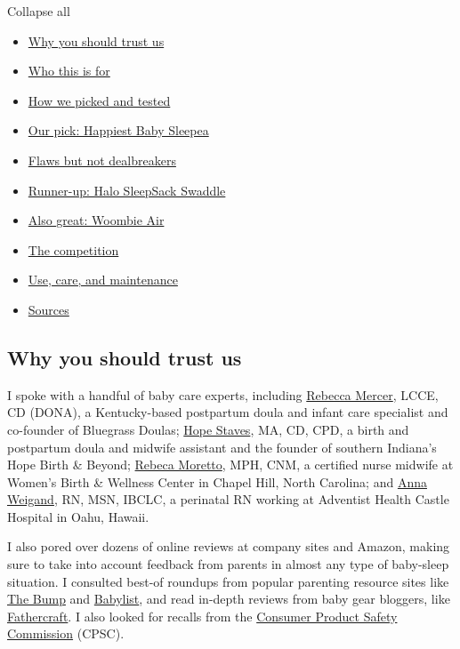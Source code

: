 Collapse all

\begin{itemize}
\tightlist
\item
  \protect\hyperlink{why-you-should-trust-us}{Why you should trust us}
\item
  \protect\hyperlink{who-this-is-for}{Who this is for}
\item
  \protect\hyperlink{how-we-picked-and-tested}{How we picked and tested}
\item
  \protect\hyperlink{our-pick-happiest-baby-sleepea}{Our pick: Happiest
  Baby Sleepea}
\item
  \protect\hyperlink{flaws-but-not-dealbreakers}{Flaws but not
  dealbreakers}
\item
  \protect\hyperlink{runner-up-halo-sleepsack-swaddle}{Runner-up: Halo
  SleepSack Swaddle}
\item
  \protect\hyperlink{also-great-woombie-air}{Also great: Woombie Air}
\item
  \protect\hyperlink{the-competition}{The competition}
\item
  \protect\hyperlink{use-care-and-maintenance}{Use, care, and
  maintenance}
\item
  \protect\hyperlink{sources}{Sources}
\end{itemize}

\hypertarget{why-you-should-trust-us}{%
\subsection{Why you should trust us}\label{why-you-should-trust-us}}

I spoke with a handful of baby care experts, including
\href{https://www.bluegrassdoulas.com/about}{Rebecca Mercer}, LCCE, CD
(DONA), a Kentucky-based postpartum doula and infant care specialist and
co-founder of Bluegrass Doulas;
\href{https://www.hopebirthandbeyond.com/about-us}{Hope Staves}, MA, CD,
CPD, a birth and postpartum doula and midwife assistant and the founder
of southern Indiana's Hope Birth \& Beyond;
\href{https://ncbirthcenter.org/who-we-are/certified-nurse-midwives/}{Rebeca
Moretto}, MPH, CNM, a certified nurse midwife at Women's Birth \&
Wellness Center in Chapel Hill, North Carolina; and
\href{https://www.linkedin.com/in/anna-weigand-msn-ibclc-b85a4a21/}{Anna
Weigand}, RN, MSN, IBCLC, a perinatal RN working at Adventist Health
Castle Hospital in Oahu, Hawaii.

I also pored over dozens of online reviews at company sites and Amazon,
making sure to take into account feedback from parents in almost any
type of baby-sleep situation. I consulted best-of roundups from popular
parenting resource sites like
\href{https://www.thebump.com/a/swaddling-blankets}{The Bump} and
\href{https://www.babylist.com/hello-baby/best-swaddles}{Babylist}, and
read in-depth reviews from baby gear bloggers, like
\href{https://fathercraft.com/sleepea-review/}{Fathercraft}. I also
looked for recalls from the \href{https://www.cpsc.gov}{Consumer Product
Safety Commission} (CPSC).

